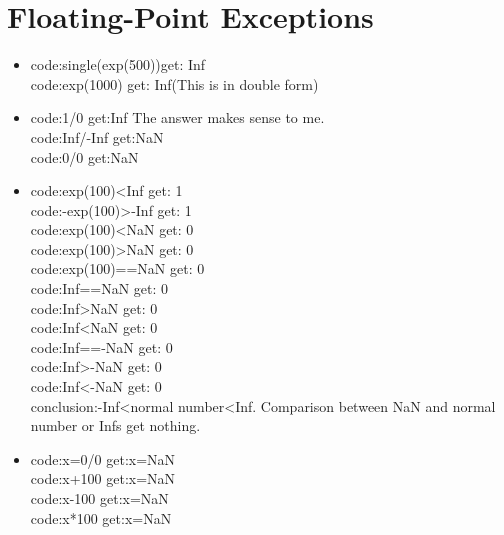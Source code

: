 \documentclass{article}
\begin{document}
\section{Floating-Point Exceptions}
\begin{itemize}
\item code:single(exp(500))\quad get:\quad {\underline{\textcolor{blue}{single}}} Inf\\
code:exp(1000) \quad get: Inf\quad(This is in double form)

\item code:1/0 \quad get:\quad Inf \quad The answer makes sense to me.\\
code:Inf/-Inf \quad get:\quad NaN\\
code:0/0 \quad get:\quad NaN

\item code:\quad exp(100)<Inf \quad get:\quad {\underline{\textcolor{blue}{logical}}} 1\\
code:\quad -exp(100)>-Inf \quad get:\quad {\underline{\textcolor{blue}{logical}}} 1\\
code:\quad exp(100)<NaN \quad get:\quad {\underline{\textcolor{blue}{logical}}} 0\\
code:\quad exp(100)>NaN \quad get:\quad {\underline{\textcolor{blue}{logical}}} 0\\
code:\quad exp(100)==NaN \quad get:\quad {\underline{\textcolor{blue}{logical}}} 0\\
code:\quad Inf==NaN \quad get:\quad {\underline{\textcolor{blue}{logical}}} 0\\
code:\quad Inf>NaN \quad get:\quad {\underline{\textcolor{blue}{logical}}} 0\\
code:\quad Inf<NaN \quad get:\quad {\underline{\textcolor{blue}{logical}}} 0\\
code:\quad Inf==-NaN \quad get:\quad {\underline{\textcolor{blue}{logical}}} 0\\
code:\quad Inf>-NaN \quad get:\quad {\underline{\textcolor{blue}{logical}}} 0\\
code:\quad Inf<-NaN \quad get:\quad {\underline{\textcolor{blue}{logical}}} 0\\
conclusion:-Inf<normal number<Inf. Comparison between NaN and normal number or Infs get nothing.
\item code:x=0/0 \quad get:\quad x=NaN\\
code:x+100 \quad get:\quad x=NaN\\
code:x-100 \quad get:\quad x=NaN\\
code:x*100 \quad get:\quad x=NaN\\

\end{itemize}
\end{document}
